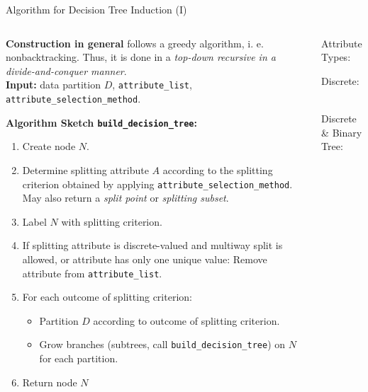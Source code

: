 \begin{frame}{Algorithm for Decision Tree Induction (I)}
	\vspace*{-1em}
	\begin{columns}
		\begin{column}{0.75\textwidth}
			\textbf{Construction in general} follows a greedy algorithm, i. e. nonbacktracking. Thus, it is done in a \textit{top-down recursive in a divide-and-conquer manner}.\\\medskip
			\textbf{Input:} data partition $D$, \texttt{attribute\_list}, \texttt{attribute\_selection\_method}.\\\medskip

			\textbf{Algorithm Sketch \texttt{build\_decision\_tree}:}
			\footnotesize
			\begin{enumerate}
				\item Create node $N$.
				\item Determine splitting attribute $A$ according to the splitting criterion
				      obtained by applying \texttt{attribute\_selection\_method}.  May also return a \textit{split point} or \textit{splitting subset}.
				\item Label $N$ with splitting criterion.
				\item If splitting attribute is discrete-valued and multiway split is allowed, or attribute has only one unique value: Remove attribute from \texttt{attribute\_list}.
				\item For each outcome of splitting criterion:
				      \begin{itemize}
					      \footnotesize
					      \item Partition $D$ according to outcome of splitting criterion.
					      \item Grow branches (subtrees, call \texttt{build\_decision\_tree}) on $N$ for each partition.
				      \end{itemize}
				\item Return node $N$
			\end{enumerate}


		\end{column}
		\begin{column}{0.25\textwidth}
			\vspace*{-3em}
			\centering

			Attribute Types:
			\small

			Discrete:
			\begin{figure}[t]
				\centering
				
			\end{figure}
			~ \\\bigskip
			Discrete \& Binary Tree:
			\begin{figure}[t]
				\centering
				
			\end{figure}


\end{column}
\end{columns}
\end{frame}
